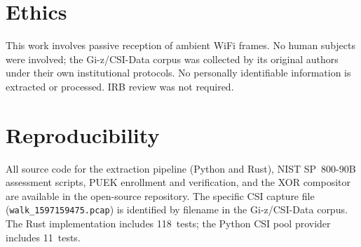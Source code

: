 \section*{Ethics}
This work involves passive reception of ambient WiFi frames.
No human subjects were involved; the Gi-z/CSI-Data corpus was collected by its original authors under their own institutional protocols.
No personally identifiable information is extracted or processed.
IRB review was not required.

\section*{Reproducibility}
All source code for the extraction pipeline (Python and Rust), NIST SP~800-90B assessment scripts, PUEK enrollment and verification, and the XOR compositor are available in the open-source repository.
The specific CSI capture file (\texttt{walk\_1597159475.pcap}) is identified by filename in the Gi-z/CSI-Data corpus.
The Rust implementation includes 118~tests; the Python CSI pool provider includes 11~tests.
